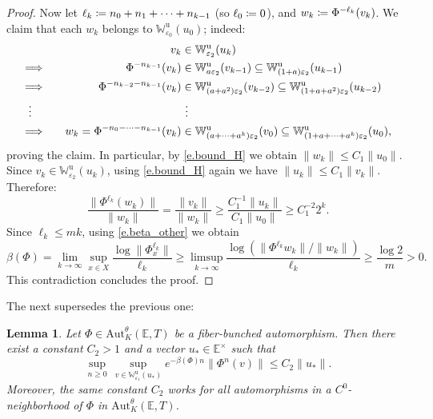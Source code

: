 \documentclass[JEP,XML,SOM,Unicode]{cedram}
\def\vcentcolon{\mathrel{\mathop\ordinarycolon}}
\providecommand\ordinarycolon{:}
\providecommand*\coloneqq{\vcentcolon\mathrel{\mkern-1.2mu}=}
\newcommand\implique{\mathchoice{\Longrightarrow}{\Rightarrow}{\Rightarrow}{\Rightarrow}}
\theoremstyle{plain}
\newtheorem{lemma}[theorem]{Lemma}
\theoremstyle{definition}
\newcommand{\EE}{\mathbb{E}}
\newcommand{\WW}{\mathbb{W}}
\newcommand{\uu}{\mathrm{u}}
\newcommand{\Aut}{\mathrm{Aut}}
\let\epsilon\varepsilon
\begin{document}
\begin{proof}
Now let $\ell_k \coloneqq n_0 + n_1 + \cdots + n_{k-1}$ (so $\ell_0 \coloneqq 0$), and $w_k \coloneqq \Phi^{-\ell_k}(v_k)$.
We claim that each $w_k$ belongs to $\WW^\uu_{\epsilon_0} (u_0)$;
indeed:
\begin{alignat*}{2}
&&v_k &\in \WW^\uu_{\epsilon_2}(u_k) \\
\implique\quad&&\Phi^{-n_{k-1}}(v_k) &\in \WW^\uu_{a \epsilon_2}(v_{k-1}) \subseteq \WW^\uu_{(1+a) \epsilon_2}(u_{k-1}) \\
\implique\quad&&\Phi^{-n_{k-2}-n_{k-1}}(v_k) &\in \WW^\uu_{(a+a^2) \epsilon_2}(v_{k-2}) \subseteq \WW^\uu_{(1 + a+a^2) \epsilon_2}(u_{k-2})\\
\vdots\quad\quad&&&\ \vdots \\
\implique\quad&&w_k = \Phi^{-n_{0} - \cdots -n_{k-1}}(v_k) &\in \WW^\uu_{(a+\cdots+a^k) \epsilon_2}(v_0) \subseteq \WW^\uu_{(1 + a + \cdots + a^k) \epsilon_2}(u_0),
\end{alignat*}
proving the claim.
In particular, by \eqref{e.bound_H} we obtain $\|w_k\| \le C_1 \|u_0\|$.
Since $v_k \in \WW^\uu_{\epsilon_2}(u_k)$, using \eqref{e.bound_H} again we have $\|u_k\| \le C_1 \|v_k\|$.
Therefore:
\[
\frac{\|\Phi^{\ell_k} (w_k)\|}{\|w_k\|}
= \frac{\|v_k\|}{\|w_k\|}
\ge \frac{C_1^{-1} \|u_k\|}{C_1 \|u_0\|}
\ge C_1^{-2} 2^k
.
\]
Since $\ell_k \le mk$, using \eqref{e.beta_other} we obtain
\[
\beta(\Phi) = \lim_{k \to \infty} \sup_{x\in X} \frac{ \log \|\Phi^{\ell_k}_x \|}{\ell_k}
\ge \limsup_{k \to \infty} \frac{ \log (\|\Phi^{\ell_k} w_k \|/\|w_k\|)}{\ell_k} \ge \frac{\log 2}{m} > 0.
\]
This contradiction concludes the proof.
\end{proof}

The next  supersedes the previous one:

\begin{lemma}\label{l.input}
Let $\Phi \in \Aut^\theta_K(\EE,T)$ be a fiber-bunched automorphism.
Then there exist a constant $C_2>1$ and a vector $u_* \in \EE^\times$ such that
\[
\sup_{n \ge 0} \, \sup_{v \in \WW^\uu_{\epsilon_1}(u_*)} e^{-\beta(\Phi) n} \| \Phi^n (v) \| \le C_2 \|u_*\|.
\]
Moreover, the same constant $C_2$ works for all automorphisms in a $C^0$-neighborhood of $\Phi$ in $\Aut^\theta_K(\EE,T)$.
\end{lemma}
\end{document}
